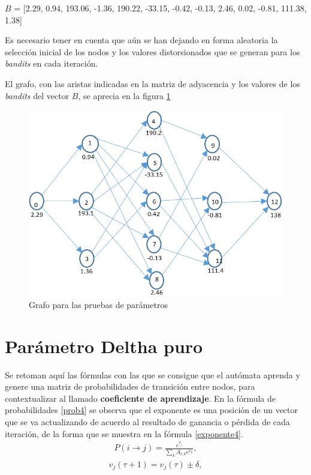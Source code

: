 $B$ = [2.29, 0.94, 193.06, -1.36, 190.22, -33.15, -0.42, -0.13, 2.46, 0.02, -0.81, 111.38, 1.38]

Es necesario tener en cuenta que aún se han dejando en forma aleatoria la selección inicial de los nodos y los valores distorsionados que se generan para los \textit{bandits} en cada iteración.

El grafo, con las aristas indicadas en la matriz de adyacencia y los valores de los \textit{bandits} del vector $B$, se aprecia en la figura \ref{Grafocaso1}
\begin{figure}[H]
	\centering
	\includegraphics[scale=0.8]{Grafo5L.png}
	\caption{Grafo para las pruebas de parámetros}
	\label{Grafocaso1}
\end{figure}


\section{Parámetro Deltha puro}

Se retoman aquí las fórmulas con las que se consigue que el autómata aprenda y genere una matriz de probabilidades de transición entre nodos, para contextualizar al llamado \textbf{coeficiente de aprendizaje}. En la fórmula de probabilidades \ref{prob4} se observa que el exponente es una posición de un vector que se va actualizando de acuerdo al resultado de ganancia o pérdida de cada iteración, de la forma que se muestra en la fórmula \ref{exponente4}.
\begin{eqnarray}\label{prob4}
P(i \to j) = \frac{e^{v_j}}{\sum_k A_{i,k} e^{v_k}},
\end{eqnarray}
\begin{eqnarray}\label{exponente4}
v_j(\tau + 1) = v_j(\tau) \pm \delta,
\end{eqnarray}

